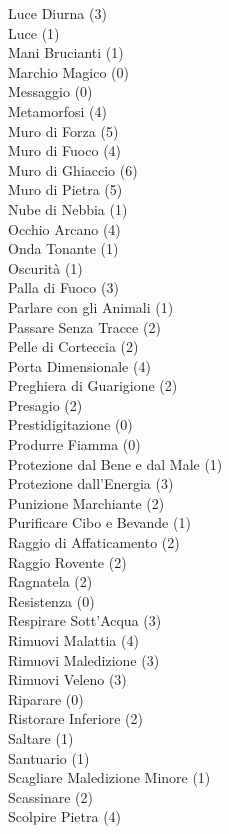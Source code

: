 \begin{multicols}{3}
{	Luce Diurna (3)\\
	Luce (1)\\
	Mani Brucianti (1)\\
	Marchio Magico (0)\\
	Messaggio (0)\\
	Metamorfosi (4)\\
	Muro di Forza (5)\\
	Muro di Fuoco (4)\\
	Muro di Ghiaccio (6)\\
	Muro di Pietra (5)\\
	Nube di Nebbia (1)\\
	Occhio Arcano (4)\\
	Onda Tonante (1)\\
	Oscurità (1)\\
	Palla di Fuoco (3)\\
	Parlare con gli Animali (1)\\
	Passare Senza Tracce (2)\\
	Pelle di Corteccia (2)\\
	Porta Dimensionale (4)\\
	Preghiera di Guarigione (2)\\
	Presagio (2)\\
	Prestidigitazione (0)\\
	Produrre Fiamma (0)\\
	Protezione dal Bene e dal Male (1)\\
	Protezione dall'Energia (3)\\
	Punizione Marchiante (2)\\
	Purificare Cibo e Bevande (1)\\
	Raggio di Affaticamento (2)\\
	Raggio Rovente (2)\\
	Ragnatela (2)\\
	Resistenza (0)\\
	Respirare Sott'Acqua (3)\\
	Rimuovi Malattia (4)\\
	Rimuovi Maledizione (3)\\
	Rimuovi Veleno (3)\\
	Riparare (0)\\
	Ristorare Inferiore (2)\\
	Saltare (1)\\
	Santuario (1)\\
	Scagliare Maledizione Minore (1)\\
	Scassinare (2)\\
	Scolpire Pietra (4)\\
}
\end{multicols}
